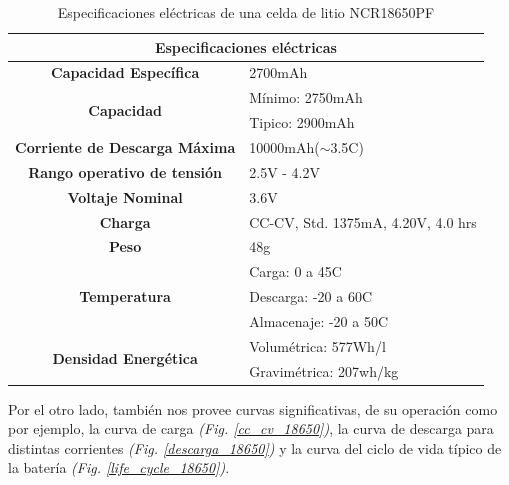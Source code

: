 \documentclass[10pt, a4paper]{article}
\begin{document}
\begin{table}[h]
    \begin{center}
	\begin{tabular}{|c|l|}
	    \hline
	    \multicolumn{2}{|c|}{Especificaciones el\'ectricas}                          \\ \hline
	    \textbf{Capacidad Específica}                 & 2700mAh                            \\ \hline
	    \multirow{2}{*}{\textbf{Capacidad}}           & Mínimo: 2750mAh                    \\ \cline{2-2} 
	    & Tipico: 2900mAh                    \\ \hline
	    \textbf{Corriente de Descarga Máxima}         & 10000mAh($\sim$3.5C)               \\ \hline
	    \textbf{Rango operativo de tensión}           & 2.5V - 4.2V                        \\ \hline
	    \textbf{Voltaje Nominal}                      & 3.6V                               \\ \hline
	    \textbf{Charga}                               & CC-CV, Std. 1375mA, 4.20V, 4.0 hrs \\ \hline
	    \textbf{Peso}                                 & 48g                              \\ \hline
	    \multirow{3}{*}{\textbf{Temperatura}}         & Carga: 0 a 45C                     \\ \cline{2-2} 
	    & Descarga: -20 a 60C                \\ \cline{2-2} 
	    & Almacenaje: -20 a 50C              \\ \hline
	    \multirow{2}{*}{\textbf{Densidad Energética}} & Volum\'etrica: 577Wh/l               \\ \cline{2-2} 
	    & Gravim\'etrica: 207wh/kg             \\ \hline
	\end{tabular}%
	\caption{Especificaciones el\'ectricas de una celda de litio NCR18650PF}
	\label{ncr18650pf_table}
    \end{center}
\end{table}

Por el otro lado, \cite{18650pf} también nos provee curvas significativas, de su
operaci\'on como por ejemplo, la curva de carga \emph{(Fig. \ref{cc_cv_18650})}, 
la curva de descarga para distintas corrientes 
\emph{(Fig. \ref{descarga_18650})} y la curva del ciclo de vida típico de la 
batería \emph{(Fig. \ref{life_cycle_18650})}.
\end{document}
